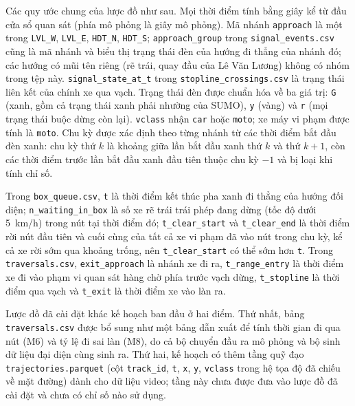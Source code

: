 \documentclass[../DoAn.tex]{subfiles}
\begin{document}
\begin{sloppypar}
Các quy ước chung của lược đồ như sau. Mọi thời điểm tính bằng giây kể từ đầu cửa sổ quan sát (phía mô phỏng là giây mô phỏng). Mã nhánh \texttt{approach} là một trong \texttt{LVL\_W}, \texttt{LVL\_E}, \texttt{HDT\_N}, \texttt{HDT\_S}; \texttt{approach\_group} trong \texttt{signal\_events.csv} cũng là mã nhánh và biểu thị trạng thái đèn của hướng đi thẳng của nhánh đó; các hướng có mũi tên riêng (rẽ trái, quay đầu của Lê Văn Lương) không có nhóm trong tệp này. \texttt{signal\_state\_at\_t} trong \texttt{stopline\_crossings.csv} là trạng thái liên kết của chính xe qua vạch. Trạng thái đèn được chuẩn hóa về ba giá trị: \texttt{G} (xanh, gồm cả trạng thái xanh phải nhường của SUMO), \texttt{y} (vàng) và \texttt{r} (mọi trạng thái buộc dừng còn lại). \texttt{vclass} nhận \texttt{car} hoặc \texttt{moto}; xe máy vi phạm được tính là \texttt{moto}. Chu kỳ được xác định theo từng nhánh từ các thời điểm bắt đầu đèn xanh: chu kỳ thứ $k$ là khoảng giữa lần bắt đầu xanh thứ $k$ và thứ $k+1$, còn các thời điểm trước lần bắt đầu xanh đầu tiên thuộc chu kỳ $-1$ và bị loại khi tính chỉ số.
\end{sloppypar}

\begin{sloppypar}
Trong \texttt{box\_queue.csv}, \texttt{t} là thời điểm kết thúc pha xanh đi thẳng của hướng đối diện; \texttt{n\_waiting\_in\_box} là số xe rẽ trái trái phép đang dừng (tốc độ dưới 5~km/h) trong nút tại thời điểm đó; \texttt{t\_clear\_start} và \texttt{t\_clear\_end} là thời điểm rời nút đầu tiên và cuối cùng của tất cả xe vi phạm đã vào nút trong chu kỳ, kể cả xe rời sớm qua khoảng trống, nên \texttt{t\_clear\_start} có thể sớm hơn \texttt{t}. Trong \texttt{traversals.csv}, \texttt{exit\_approach} là nhánh xe đi ra, \texttt{t\_range\_entry} là thời điểm xe đi vào phạm vi quan sát hàng chờ phía trước vạch dừng, \texttt{t\_stopline} là thời điểm qua vạch và \texttt{t\_exit} là thời điểm xe vào làn ra.
\end{sloppypar}

Lược đồ đã cài đặt khác kế hoạch ban đầu ở hai điểm. Thứ nhất, bảng \texttt{traversals.csv} được bổ sung như một bảng dẫn xuất để tính thời gian đi qua nút (M6) và tỷ lệ đi sai làn (M8), do cả bộ chuyển đầu ra mô phỏng và bộ sinh dữ liệu đại diện cùng sinh ra. Thứ hai, kế hoạch có thêm tầng quỹ đạo \texttt{trajectories.parquet} (cột \texttt{track\_id}, \texttt{t}, \texttt{x}, \texttt{y}, \texttt{vclass} trong hệ tọa độ đã chiếu về mặt đường) dành cho dữ liệu video; tầng này chưa được đưa vào lược đồ đã cài đặt và chưa có chỉ số nào sử dụng.
\end{document}
